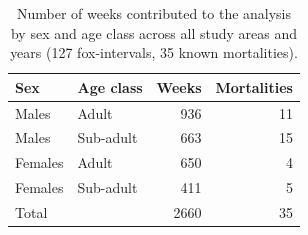 
\begin{table}[t]
    \centering
    \captionsetup{font=scriptsize}
    \caption{Number of weeks contributed to the analysis by sex and age
        class across all study areas and years (127 fox-intervals, 35 known
        mortalities).}
    \label{table:weeks}
    \scriptsize
    \begin{tabular}{llrr}
        \toprule
        Sex     & Age class & Weeks & Mortalities \\
        \midrule
        Males   & Adult     & 936   & 11          \\
        Males   & Sub-adult & 663   & 15          \\
        Females & Adult     & 650   & 4           \\
        Females & Sub-adult & 411   & 5           \\
        \midrule
        Total   &           & 2660  & 35          \\
        \bottomrule
    \end{tabular}
\end{table}
